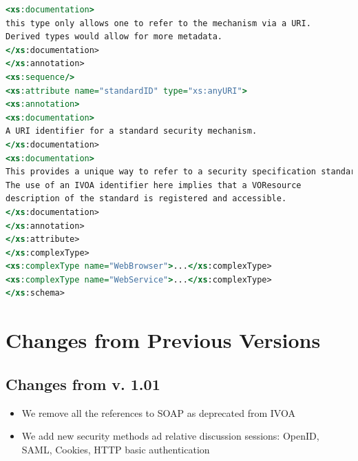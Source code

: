 \documentclass[11pt,a4paper]{ivoa}
\begin{document}
\begin{lstlisting}[language=XSLT]
<xs:documentation>
this type only allows one to refer to the mechanism via a URI. 
Derived types would allow for more metadata.
</xs:documentation>
</xs:annotation>
<xs:sequence/>
<xs:attribute name="standardID" type="xs:anyURI">
<xs:annotation>
<xs:documentation>
A URI identifier for a standard security mechanism.
</xs:documentation>
<xs:documentation>
This provides a unique way to refer to a security specification standard. 
The use of an IVOA identifier here implies that a VOResource 
description of the standard is registered and accessible.
</xs:documentation>
</xs:annotation>
</xs:attribute>
</xs:complexType>
<xs:complexType name="WebBrowser">...</xs:complexType>
<xs:complexType name="WebService">...</xs:complexType>
</xs:schema>
\end{lstlisting}


\section{Changes from Previous Versions}

 
\subsection {Changes from v. 1.01}
\begin{itemize}
\item We remove all the references to SOAP as deprecated from IVOA
\item We add new security methods ad relative discussion sessions: OpenID, SAML, Cookies, HTTP basic authentication
\end{itemize}



\end{document}
